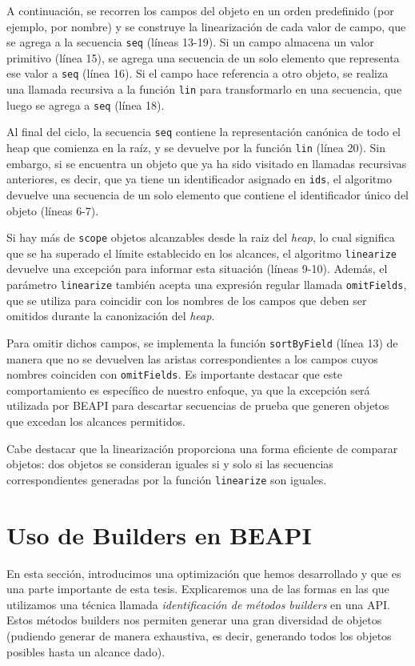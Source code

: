 A continuación, se recorren los campos del objeto en un orden predefinido (por ejemplo, por nombre) y se construye la linearización de cada valor de campo, que se agrega a la secuencia \texttt{seq} (líneas 13-19). Si un campo almacena un valor primitivo (línea 15), se agrega una secuencia de un solo elemento que representa ese valor a \texttt{seq} (línea 16). Si el campo hace referencia a otro objeto, se realiza una llamada recursiva a la función \texttt{lin} para transformarlo en una secuencia, que luego se agrega a \texttt{seq} (línea 18).

Al final del ciclo, la secuencia \texttt{seq} contiene la representación canónica de todo el heap que comienza en la raíz, y se devuelve por la función \texttt{lin} (línea 20). Sin embargo, si se encuentra un objeto que ya ha sido visitado en llamadas recursivas anteriores, es decir, que ya tiene un identificador asignado en \texttt{ids}, el algoritmo devuelve una secuencia de un solo elemento que contiene el identificador único del objeto (líneas 6-7).

Si hay más de \texttt{scope} objetos alcanzables desde la raiz del \emph{heap}, lo cual significa que se ha superado el límite establecido en los alcances, el algoritmo \texttt{linearize} devuelve una excepción para informar esta situación (líneas 9-10). Además, el parámetro \texttt{linearize} también acepta una expresión regular llamada \texttt{omitFields}, que se utiliza para coincidir con los nombres de los campos que deben ser omitidos durante la canonización del \emph{heap}.

Para omitir dichos campos, se implementa la función \texttt{sortByField} (línea 13) de manera que no se devuelven las aristas correspondientes a los campos cuyos nombres coinciden con \texttt{omitFields}. Es importante destacar que este comportamiento es específico de nuestro enfoque, ya que la excepción será utilizada por \textsf{BEAPI} para descartar secuencias de prueba que generen objetos que excedan los alcances permitidos.

Cabe destacar que la linearización proporciona una forma eficiente de comparar objetos: dos objetos se consideran iguales si y solo si las secuencias correspondientes generadas por la función \texttt{linearize} son iguales.


\section{Uso de Builders en BEAPI}
\label{sec:builders}
En esta sección, introducimos una optimización que hemos desarrollado y que es una parte importante de esta tesis. Explicaremos una de las formas en las que utilizamos una técnica llamada \emph{identificación de métodos builders} en una API. Estos métodos builders nos permiten generar una gran diversidad de objetos (pudiendo generar de manera exhaustiva, es decir, generando todos los objetos posibles hasta un alcance dado).

